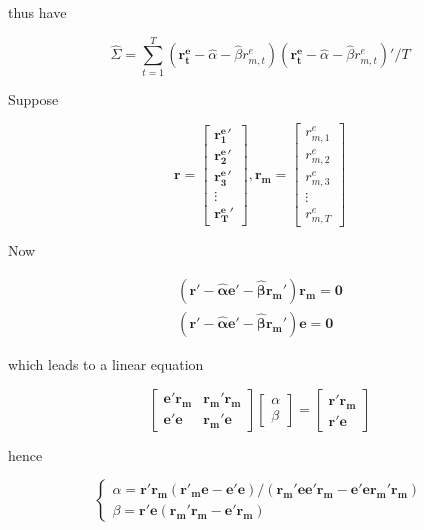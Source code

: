 \documentclass{article}
\begin{document}
thus have

\[ \hat{\Sigma}= \sum_{t=1}^T (\mathbf { r_t^e } -\hat{\alpha}-\hat{\beta} r_{m,t}^e)(\mathbf { r_t^e } -\hat{\alpha}-\hat{\beta} r_{m,t}^e)'/T\]

Suppose

\[\mathbf{r}= \begin{bmatrix}
  \mathbf{r_1^e}'\\
  \mathbf{r_2^e}'\\
  \mathbf{r_3^e}'\\
  \vdots\\
  \mathbf{r_T^e}'
\end{bmatrix},\mathbf{r_m}=\begin{bmatrix}
  r_{m,1}^e\\
  r_{m,2}^e\\
  r_{m,3}^e\\
  \vdots\\
  r_{m,T}^e
\end{bmatrix} \]

Now

\[ \begin{aligned}
  \mathbf{(r'-\hat{\alpha}e'-\hat{\beta}r_m')r_m=0}\\
  \mathbf{(r'-\hat{\alpha}e'-\hat{\beta}r_m')e=0}
\end{aligned} \]

which leads to a linear equation

\[ \begin{bmatrix}
  \mathbf{e'r_m}&\mathbf{r_m'r_m}\\
  \mathbf{e'e}&\mathbf{r_m'e}
\end{bmatrix}\begin{bmatrix}
  \alpha\\\beta
\end{bmatrix}=\begin{bmatrix}
  \mathbf{r'r_m}\\
  \mathbf{r'e}
\end{bmatrix} \]

hence

\[ \begin{cases}
  \alpha=\mathbf{r'r_m(r'_me-e'e)}/(\mathbf{r_m'ee'r_m-e'er_m'r_m})\\
  \beta=\mathbf{r'e(r_m'r_m-e'r_m)}
\end{cases} \]



\end{document}
